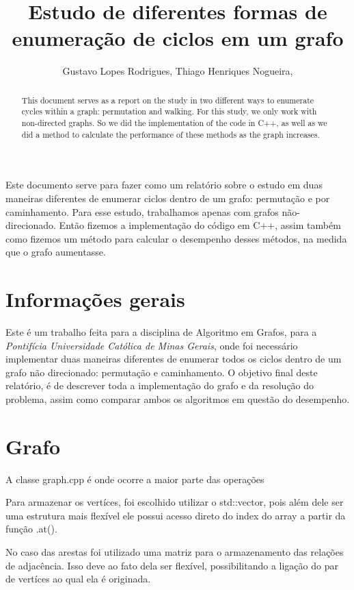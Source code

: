 \documentclass[12pt]{article}
\title{Estudo de diferentes formas de enumeração de ciclos em um grafo}
\author{Gustavo Lopes Rodrigues\inst{1}, Thiago Henriques Nogueira\inst{2},}
\begin{document}
 

\maketitle

\begin{abstract} 
  This document serves as a report on the study in two different ways
  to enumerate cycles within a graph: permutation and walking. For this
  study, we only work with non-directed graphs. So we did the implementation
  of the code in C++, as well as we did a method to calculate the performance of these
  methods as the graph increases.
\end{abstract}

\begin{resumo} 
  Este documento serve para fazer como um relatório sobre o estudo em duas maneiras 
  diferentes de enumerar ciclos dentro de um grafo: permutação e por caminhamento. Para esse 
  estudo, trabalhamos apenas com grafos não-direcionado. Então fizemos a implementação 
  do código em C++, assim também como fizemos um método para calcular o desempenho desses 
  métodos, na medida que o grafo aumentasse.
\end{resumo}


\section{Informações gerais}

  Este é um trabalho feita para a disciplina de Algoritmo em Grafos, para a \emph{Pontifícia Universidade Católica de Minas Gerais},
  onde foi necessário implementar duas maneiras diferentes de enumerar todos os ciclos dentro de um grafo não direcionado: permutação e caminhamento. O objetivo final 
  deste relatório, é de descrever toda a implementação do grafo e da resolução do problema, assim como comparar ambos os algoritmos 
  em questão do desempenho.

  \section{Grafo}

  A classe graph.cpp é onde ocorre a maior parte das operações
  
  Para armazenar os vertíces, foi escolhido utilizar o std::vector, pois além dele ser uma estrutura mais 
  flexível ele possui acesso direto do index do array a partir da função .at().

  No caso das arestas foi utilizado uma matriz para o armazenamento das relações de adjacência. Isso deve 
  ao fato dela ser flexível, possibilitando a ligação do par de vertíces ao qual ela é originada.
\end{document}
